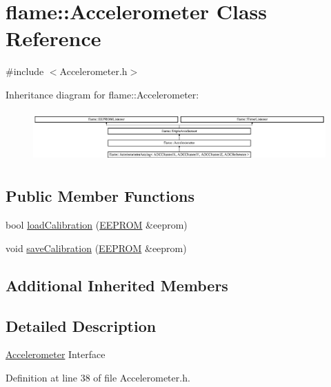 \hypertarget{classflame_1_1_accelerometer}{\section{flame\-:\-:Accelerometer Class Reference}
\label{classflame_1_1_accelerometer}
}


{\ttfamily \#include $<$Accelerometer.\-h$>$}

Inheritance diagram for flame\-:\-:Accelerometer\-:\begin{figure}[H]
\begin{center}
\leavevmode
\includegraphics[height=1.982301cm]{classflame_1_1_accelerometer}
\end{center}
\end{figure}
\subsection*{Public Member Functions}
\begin{DoxyCompactItemize}
\item 
bool \hyperlink{classflame_1_1_accelerometer_a408179e458d41aa08e06b721a6b8aa81}{load\-Calibration} (\hyperlink{classflame_1_1_e_e_p_r_o_m}{E\-E\-P\-R\-O\-M} \&eeprom)
\item 
void \hyperlink{classflame_1_1_accelerometer_afc95c5291e223eb400a0c9a33a44f71f}{save\-Calibration} (\hyperlink{classflame_1_1_e_e_p_r_o_m}{E\-E\-P\-R\-O\-M} \&eeprom)
\end{DoxyCompactItemize}
\subsection*{Additional Inherited Members}


\subsection{Detailed Description}
\hyperlink{classflame_1_1_accelerometer}{Accelerometer} Interface 

Definition at line 38 of file Accelerometer.\-h.



